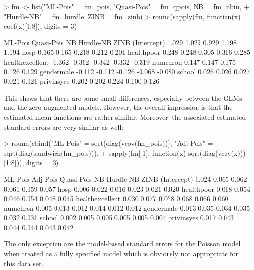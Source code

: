 \documentclass{Z}
\begin{document}
\begin{Schunk}
\begin{Sinput}
> fm <- list("ML-Pois" = fm_pois, "Quasi-Pois" = fm_qpois, NB = fm_nbin, 
+     "Hurdle-NB" = fm_hurdle, ZINB = fm_zinb)
> round(sapply(fm, function(x) coef(x)[1:8]), digits = 3)
\end{Sinput}
\begin{Soutput}
                ML-Pois Quasi-Pois     NB Hurdle-NB   ZINB
(Intercept)       1.029      1.029  0.929     1.198  1.194
hosp              0.165      0.165  0.218     0.212  0.201
healthpoor        0.248      0.248  0.305     0.316  0.285
healthexcellent  -0.362     -0.362 -0.342    -0.332 -0.319
numchron          0.147      0.147  0.175     0.126  0.129
gendermale       -0.112     -0.112 -0.126    -0.068 -0.080
school            0.026      0.026  0.027     0.021  0.021
privinsyes        0.202      0.202  0.224     0.100  0.126
\end{Soutput}
\end{Schunk}

This shows that there are some small differences, especially between the GLMs and the
zero-augmented models. However, the overall impression is that the estimated
mean functions are rather similar. Moreover, the associated estimated standard errors
are very similar as well:
\begin{Schunk}
\begin{Sinput}
> round(cbind("ML-Pois" = sqrt(diag(vcov(fm_pois))), "Adj-Pois" = sqrt(diag(sandwich(fm_pois))), 
+     sapply(fm[-1], function(x) sqrt(diag(vcov(x)))[1:8])), digits = 3)
\end{Sinput}
\begin{Soutput}
                ML-Pois Adj-Pois Quasi-Pois    NB Hurdle-NB  ZINB
(Intercept)       0.024    0.065      0.062 0.061     0.059 0.057
hosp              0.006    0.022      0.016 0.023     0.021 0.020
healthpoor        0.018    0.054      0.046 0.054     0.048 0.045
healthexcellent   0.030    0.077      0.078 0.068     0.066 0.060
numchron          0.005    0.013      0.012 0.014     0.012 0.012
gendermale        0.013    0.035      0.034 0.035     0.032 0.031
school            0.002    0.005      0.005 0.005     0.005 0.004
privinsyes        0.017    0.043      0.044 0.044     0.043 0.042
\end{Soutput}
\end{Schunk}
The only exception are the model-based standard errors for the Poisson model
when treated as a fully specified model which is obviously not appropriate for this data set.
\end{document}
